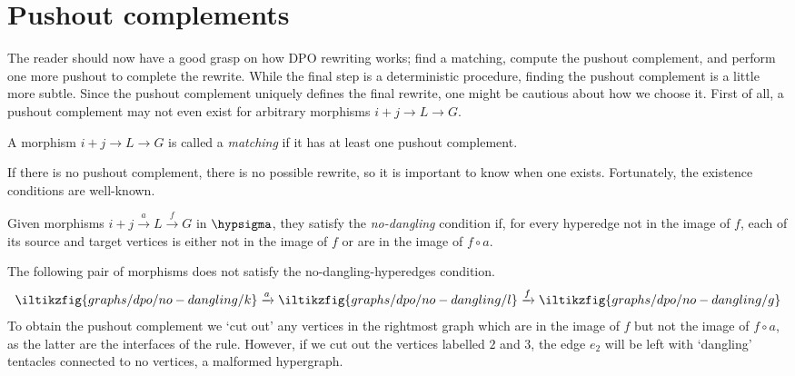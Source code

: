 \section{Pushout complements}

The reader should now have a good grasp on how DPO rewriting
works; find a matching, compute the pushout complement, and perform one more
pushout to complete the rewrite.
While the final step is a deterministic procedure, finding the pushout
complement is a little more subtle.
Since the pushout complement uniquely defines the final rewrite, one might be
cautious about how we choose it.
First of all, a pushout complement may not even exist for arbitrary morphisms
\(i+j \to L \to G\).

\begin{definition}
    A morphism \(i+j \to L \to G\) is called a \emph{matching} if it
    has at least one pushout complement.
\end{definition}

If there is no pushout complement, there is no possible rewrite, so it is
important to know when one exists.
Fortunately, the existence conditions are well-known.

\begin{definition}
    Given morphisms \(i+j \xrightarrow{a} L \xrightarrow{f} G\) in
    \(\hypsigma\), they satisfy the \emph{no-dangling} condition if, for every
    hyperedge not in
    the image of \(f\), each of its source and target vertices is either not in
    the image of \(f\) or are in the image of \(f \circ a\).
\end{definition}

\begin{example}
    The following pair of morphisms does not satisfy the no-dangling-hyperedges
    condition.
    \[
        \iltikzfig{graphs/dpo/no-dangling/k}
        \xrightarrow{a}
        \iltikzfig{graphs/dpo/no-dangling/l}
        \xrightarrow{f}
        \iltikzfig{graphs/dpo/no-dangling/g}
    \]
    To obtain the pushout complement we `cut out' any vertices in the
    rightmost graph which are in the image of \(f\) but not the image of
    \(f \circ a\), as the latter are the interfaces of the rule.
    However, if we cut out the vertices labelled \(2\) and \(3\), the edge
    \(e_2\) will be left with `dangling' tentacles connected to no vertices, a
    malformed hypergraph.
    \begin{center}
    \end{center}
\end{example}

